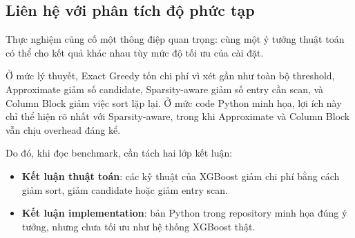 \subsection{Liên hệ với phân tích độ phức tạp}

Thực nghiệm củng cố một thông điệp quan trọng: cùng một ý tưởng thuật toán có thể cho kết quả khác nhau tùy mức độ tối ưu của cài đặt.

Ở mức lý thuyết, Exact Greedy tốn chi phí vì xét gần như toàn bộ threshold, Approximate giảm số candidate, Sparsity-aware giảm số entry cần scan, và Column Block giảm việc sort lặp lại. Ở mức code Python minh họa, lợi ích này chỉ thể hiện rõ nhất với Sparsity-aware, trong khi Approximate và Column Block vẫn chịu overhead đáng kể.

Do đó, khi đọc benchmark, cần tách hai lớp kết luận:

\begin{itemize}
    \item \textbf{Kết luận thuật toán}: các kỹ thuật của XGBoost giảm chi phí bằng cách giảm sort, giảm candidate hoặc giảm entry scan.
    \item \textbf{Kết luận implementation}: bản Python trong repository minh họa đúng ý tưởng, nhưng chưa tối ưu như hệ thống XGBoost thật.
\end{itemize}
